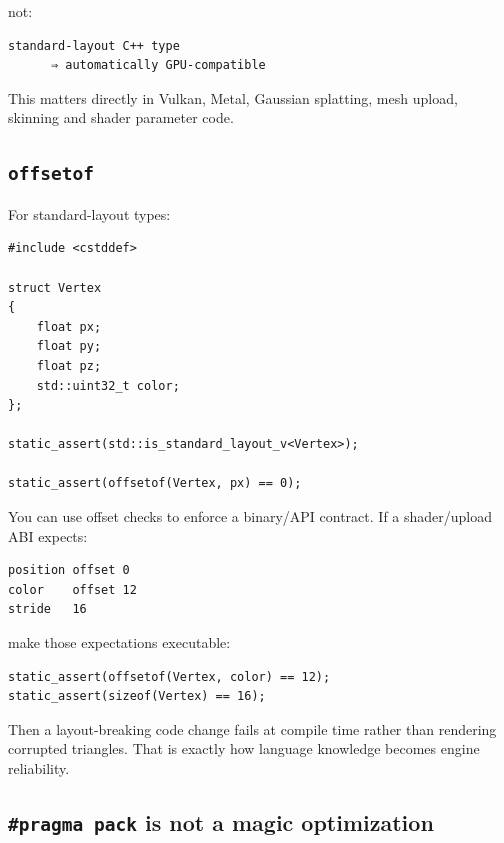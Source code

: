 not:

\begin{verbatim}
standard-layout C++ type
      ⇒ automatically GPU-compatible
\end{verbatim}

This matters directly in Vulkan, Metal, Gaussian splatting, mesh upload, skinning and shader parameter code.

\subsection{\texorpdfstring{\texttt{offsetof}}{offsetof}}\label{01-foundations-i-ch003-offsetof}

\hypertarget{01-foundations-i-ch003-offsetof}{}

For standard-layout types:

\begin{verbatim}
#include <cstddef>

struct Vertex
{
    float px;
    float py;
    float pz;
    std::uint32_t color;
};

static_assert(std::is_standard_layout_v<Vertex>);

static_assert(offsetof(Vertex, px) == 0);
\end{verbatim}

You can use offset checks to enforce a binary/API contract. If a shader/upload ABI expects:

\begin{verbatim}
position offset 0
color    offset 12
stride   16
\end{verbatim}

make those expectations executable:

\begin{verbatim}
static_assert(offsetof(Vertex, color) == 12);
static_assert(sizeof(Vertex) == 16);
\end{verbatim}

Then a layout-breaking code change fails at compile time rather than rendering corrupted triangles. That is exactly how language knowledge becomes engine reliability.

\subsection{\texorpdfstring{\texttt{\#pragma\ pack} is not a magic optimization}{\#pragma pack is not a magic optimization}}\label{01-foundations-i-ch003-pragma-pack-is-not-a-magic-optimization}

\hypertarget{01-foundations-i-ch003-pragma-pack-is-not-a-magic-optimization}{}

